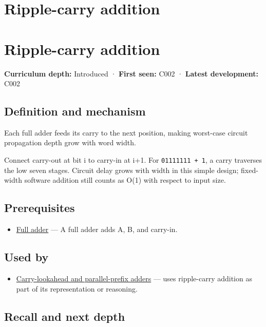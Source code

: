 \hypertarget{appendix-17917d9fdbe3}{}
\section*{Ripple-carry addition}
\section{Ripple-carry addition}\label{appendix-17917d9fdbe3-ripple-carry-addition}

\textbf{Curriculum depth:} Introduced · \textbf{First seen:} C002 · \textbf{Latest development:} C002

\subsection{Definition and mechanism}\label{appendix-17917d9fdbe3-definition-and-mechanism}

Each full adder feeds its carry to the next position, making worst-case circuit propagation depth grow with word width.

Connect carry-out at bit i to carry-in at i+1. For \texttt{01111111\ +\ 1}, a carry traverses the low seven stages. Circuit delay grows with width in this simple design; fixed-width software addition still counts as O(1) with respect to input size.

\subsection{Prerequisites}\label{appendix-17917d9fdbe3-prerequisites}

\begin{itemize}
\tightlist
\item
  \hyperref[appendix-d1a5b1e520c2]{Full adder} --- A full adder adds A, B, and carry-in.
\end{itemize}

\subsection{Used by}\label{appendix-17917d9fdbe3-used-by}

\begin{itemize}
\tightlist
\item
  \hyperref[appendix-b5c46b2d94ff]{Carry-lookahead and parallel-prefix adders} --- uses ripple-carry addition as part of its representation or reasoning.
\end{itemize}

\subsection{Recall and next depth}\label{appendix-17917d9fdbe3-recall-and-next-depth}

